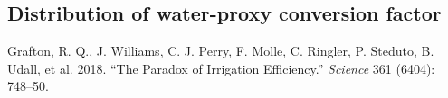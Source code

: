 \documentclass[
  letterpaper,
  DIV=11,
  numbers=noendperiod]{scrartcl}
\newlength{\cslhangindent}
\newenvironment{CSLReferences}[2] %
 {\begin{list}{}{%
  \setlength{\itemindent}{0pt}
  \setlength{\leftmargin}{0pt}
  \setlength{\parsep}{0pt}
  \ifodd #1
   \setlength{\leftmargin}{\cslhangindent}
   \setlength{\itemindent}{-1\cslhangindent}
  \fi
  \setlength{\itemsep}{#2\baselineskip}}}
 {\end{list}}
\begin{document}
\subsection*{Distribution of water-proxy conversion
factor}\label{distribution-of-water-proxy-conversion-factor}

\label{refs}
\begin{CSLReferences}{1}{0}
Grafton, R. Q., J. Williams, C. J. Perry, F. Molle, C. Ringler, P.
Steduto, B. Udall, et al. 2018. {``The Paradox of Irrigation
Efficiency.''} \emph{Science} 361 (6404): 748--50.

\end{CSLReferences}
\end{document}
